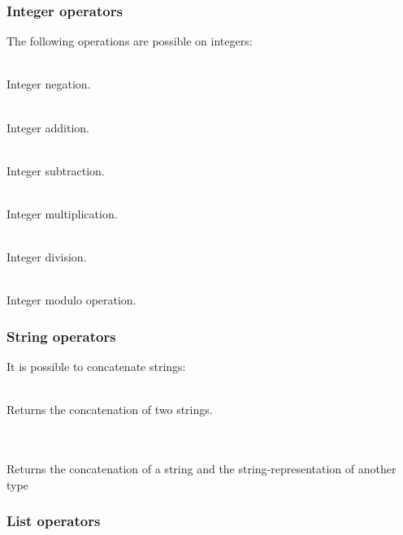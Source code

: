 \subsubsection{Integer operators}

The following operations are possible on integers:
\begin{dlist}
  \item {} \\
    Integer negation.
  \item {} \\
    Integer addition.
  \item {} \\
    Integer subtraction.
  \item {} \\
    Integer multiplication.
  \item {} \\
    Integer division.
  \item {} \\
    Integer modulo operation.
\end{dlist}

\subsubsection{String operators}

It is possible to concatenate strings:
\begin{dlist}
  \item {} \\
    Returns the concatenation of two strings.
  \item {} \\
    \\
    Returns the concatenation of a string and the string-representation of another type
\end{dlist}

\subsubsection{List operators}

